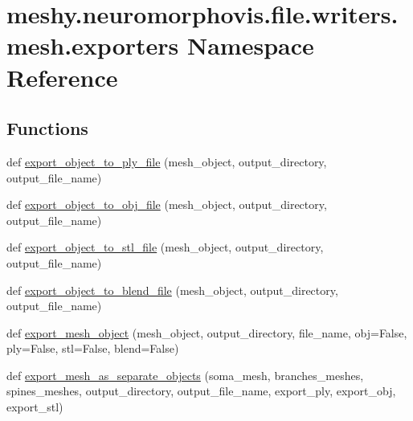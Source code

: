 \hypertarget{namespacemeshy_1_1neuromorphovis_1_1file_1_1writers_1_1mesh_1_1exporters}{}\section{meshy.\+neuromorphovis.\+file.\+writers.\+mesh.\+exporters Namespace Reference}
\label{namespacemeshy_1_1neuromorphovis_1_1file_1_1writers_1_1mesh_1_1exporters}
\subsection*{Functions}
\begin{DoxyCompactItemize}
\item 
def \hyperlink{namespacemeshy_1_1neuromorphovis_1_1file_1_1writers_1_1mesh_1_1exporters_a25245f27aacb96a136a70259690598d1}{export\+\_\+object\+\_\+to\+\_\+ply\+\_\+file} (mesh\+\_\+object, output\+\_\+directory, output\+\_\+file\+\_\+name)
\item 
def \hyperlink{namespacemeshy_1_1neuromorphovis_1_1file_1_1writers_1_1mesh_1_1exporters_a99c12896a7b3f5b1cd8db67e495b1a88}{export\+\_\+object\+\_\+to\+\_\+obj\+\_\+file} (mesh\+\_\+object, output\+\_\+directory, output\+\_\+file\+\_\+name)
\item 
def \hyperlink{namespacemeshy_1_1neuromorphovis_1_1file_1_1writers_1_1mesh_1_1exporters_a1b82ad4e9725071ddb743f2001f60ff6}{export\+\_\+object\+\_\+to\+\_\+stl\+\_\+file} (mesh\+\_\+object, output\+\_\+directory, output\+\_\+file\+\_\+name)
\item 
def \hyperlink{namespacemeshy_1_1neuromorphovis_1_1file_1_1writers_1_1mesh_1_1exporters_a79cd37915b992f6f166918519b4114e4}{export\+\_\+object\+\_\+to\+\_\+blend\+\_\+file} (mesh\+\_\+object, output\+\_\+directory, output\+\_\+file\+\_\+name)
\item 
def \hyperlink{namespacemeshy_1_1neuromorphovis_1_1file_1_1writers_1_1mesh_1_1exporters_aeeb116854bf93e073e380c31c3556f9a}{export\+\_\+mesh\+\_\+object} (mesh\+\_\+object, output\+\_\+directory, file\+\_\+name, obj=False, ply=False, stl=False, blend=False)
\item 
def \hyperlink{namespacemeshy_1_1neuromorphovis_1_1file_1_1writers_1_1mesh_1_1exporters_aa062d6f3b3e5ffdf89b169a859069080}{export\+\_\+mesh\+\_\+as\+\_\+separate\+\_\+objects} (soma\+\_\+mesh, branches\+\_\+meshes, spines\+\_\+meshes, output\+\_\+directory, output\+\_\+file\+\_\+name, export\+\_\+ply, export\+\_\+obj, export\+\_\+stl)
\end{DoxyCompactItemize}


